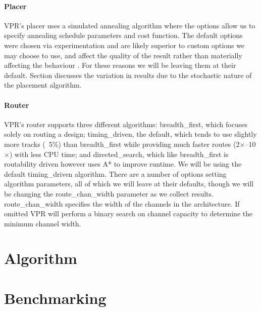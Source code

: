 \documentclass[12pt,final,oneside]{dwThesis} %
\begin{document}
\subsubsection{Placer}
\ac{VPR}'s placer uses a simulated annealing algorithm where the options allow us to specify annealing schedule parameters and cost function. The default options were chosen via experimentation and are likely superior to custom options we may choose to use, and affect the quality of the result rather than materially affecting the behaviour \cite{VPRManual, VPRBook}. For these reasons we will be leaving them at their default.
Section  discusses the variation in results due to the stochastic nature of the placement algorithm.
\subsubsection{Router}
\ac{VPR}'s router supports three different algorithms: breadth\_first, which focuses solely on routing a design; timing\_driven, the default, which tends to use slightly more tracks (~5\%) than breadth\_first while providing much faster routes (2$\times$--10$\times$) with less CPU time; and directed\_search, which like breadth\_first is routability driven however uses A* to improve runtime. We will be using the default timing\_driven algorithm.
There are a number of options setting algorithm parameters, all of which we will leave at their defaults, though we will be changing the route\_chan\_width parameter as we collect results. route\_chan\_width specifies the width of the channels in the architecture. If omitted \ac{VPR} will perform a binary search on channel capacity to determine the minimum channel width.


\chapter{Algorithm}






\chapter{Benchmarking}
\end{document}
